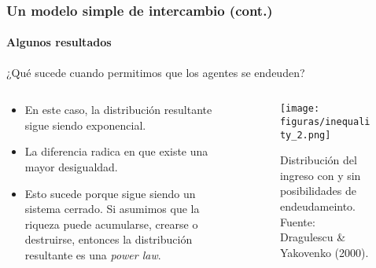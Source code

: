 \documentclass[11pt]{beamer}
\begin{document}
\begin{frame}
\frametitle{Un modelo simple de intercambio (cont.)}
\framesubtitle{Algunos resultados}
¿Qué sucede cuando permitimos que los agentes se endeuden?

\begin{columns}
\begin{column}{0.5\linewidth}
\begin{itemize}
	\item En este caso, la distribución resultante sigue siendo exponencial. 
	\item La diferencia radica en que existe una mayor desigualdad.
	\item Esto sucede porque sigue siendo un sistema cerrado. Si asumimos que la riqueza puede acumularse, crearse o destruirse, entonces la distribución resultante es una \textit{power law}.
\end{itemize}
\end{column}
\begin{column}{0.5\linewidth}
\begin{figure}
	\centering
	\texttt{[image: figuras/inequality\_2.png]}
	\caption{{\scriptsize Distribución del ingreso con y sin posibilidades de endeudameinto. Fuente: Dragulescu \& Yakovenko (2000).}}
	\label{fig:inequality1}
\end{figure}

\end{column}
\end{columns}
\end{frame}
\end{document}
